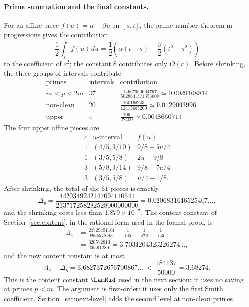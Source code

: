 \paragraph{Prime summation and the final constants.}
For an affine piece $f(u)=\alpha+\beta u$ on $[s,t]$, the prime number theorem in
progressions gives the contribution
\[
 \frac12\int_s^t f(u)\,du
 =\frac12\left(\alpha(t-s)+\frac\beta2(t^2-s^2)\right)
\]
to the coefficient of $r^2$; the constant $8$ contributes only $O(r)$. Before
shrinking, the three groups of intervals contribute
{\renewcommand{\arraystretch}{1.8}
\[
\begin{array}{c|c|c}
\text{primes}&\text{intervals}&\text{contribution}\\\hline
m<p<2m&37&\frac{14667950664797}{5028641371353600}\simeq0.0029168814\\
\text{non-clean}&20&\frac{160166243}{12415603200}\simeq0.0129003996\\
\text{upper}&4&\frac{109}{22400}\simeq0.0048660714
\end{array}
\]
}
The four upper affine pieces are
{\renewcommand{\arraystretch}{1.8}
\[
\begin{array}{c|c|c}
c&u\text{-interval}&f(u)\\\hline
1&(4/5,9/10)&9/8-5u/4\\
1&(3/5,5/8)&2u-9/8\\
3&(5/8,9/14)&9/8-7u/4\\
3&(3/5,5/8)&u/4-1/8.
\end{array}
\]
}
After shrinking, the total of the $61$ pieces is exactly
\[
 \Delta_\eta=
 \frac{4420349242147094110541}{213717258282528000000000}
 =0.0206831646525407\ldots,
\]
and the shrinking costs less than $1.879\times10^{-7}$. The content constant
of Section~\ref{sec:content}, in the rational form used in the formal proof, is
\[
 \begin{aligned}\Lambda_4&=\frac{24729491161}{6665218560}-\frac1{448}-\frac1{576}-\frac1{352}
\\ &=\frac{320572813}{86561280}=3.7034204323226274\ldots,\end{aligned}
\]
and the new content constant is at most
\[
 \Lambda_4-\Delta_\eta
 =3.6827372676700867\ldots
 \ <\ \frac{184137}{50000}=3.68274.
\]
This is the content constant $\LamMid$ used in the next section; it uses no
saving at primes $p<m$. The argument is first-order: it uses only the first
Smith coefficient. Section~\ref{sec:next-level} adds the second level at
non-clean primes.
